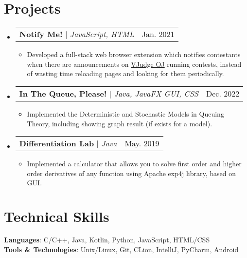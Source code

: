 \documentclass[letterpaper,11pt]{article}
\makeatletter
\newcommand{\resumeItem}[1]{
  \item\small{
    {#1 \vspace{-2pt}}
  }
}
\newcommand{\resumeProjectHeading}[2]{
    \item
    \begin{tabular*}{0.97\textwidth}{l@{\extracolsep{\fill}}r}
      \small#1 & #2 \\
    \end{tabular*}\vspace{-7pt}
}
\newcommand{\resumeSubHeadingListStart}{\begin{itemize}[leftmargin=0.15in, label={}]}
\newcommand{\resumeSubHeadingListEnd}{\end{itemize}}
\newcommand{\resumeItemListStart}{\begin{itemize}}
\newcommand{\resumeItemListEnd}{\end{itemize}\vspace{-5pt}}
\makeatother
\begin{document}
\section{Projects}
    \resumeSubHeadingListStart
      \resumeProjectHeading
          {\textbf{Notify Me!} $|$ \emph{JavaScript, HTML}}{Jan. 2021}
          \resumeItemListStart
            \resumeItem{Developed a full-stack web browser extension which notifies contestants when there are announcements on \href{https://vjudge.net/}{\underline{VJudge OJ}} running contests, instead of wasting time reloading pages and looking for them periodically.}
          \resumeItemListEnd
      \resumeProjectHeading
          {\textbf{In The Queue, Please!} $|$ \emph{Java, JavaFX GUI, CSS}}{Dec. 2022}
          \resumeItemListStart
            \resumeItem{Implemented the Deterministic and Stochastic Models in Queuing Theory, including showing graph result (if exists for a model).}
          \resumeItemListEnd
       \resumeProjectHeading
          {\textbf{Differentiation Lab} $|$ \emph{Java}}{May. 2019}
          \resumeItemListStart
            \resumeItem{Implemented a calculator that allows you to solve first order and higher order derivatives of any function using Apache exp4j library, based on GUI.}
          \resumeItemListEnd
    \resumeSubHeadingListEnd

%
\section{Technical Skills}
 \begin{itemize}[leftmargin=0.15in, label={}]
    \small{\item{
     \textbf{Languages}{: C/C++, Java, Kotlin, Python, JavaScript, HTML/CSS} \\
     \textbf{Tools \& Technologies}{: Unix/Linux, Git, CLion, IntelliJ, PyCharm, Android} \\
    }}
 \end{itemize}


\end{document}
